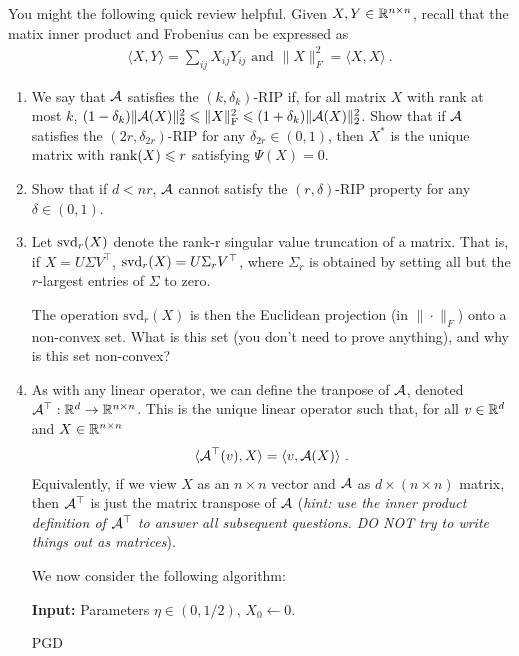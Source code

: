 \documentclass[12pt]{article}
\begin{document}
	You might the following quick review helpful. Given $X,Y \in \mathbb{R}^{n \times n}$, recall that the matix inner product and Frobenius can be expressed as
	\begin{eqnarray}
	\langle X, Y \rangle = \sum_{ij} X_{ij}Y_{ij} \text{ and } \|X\|_F^2 = \langle X,X\rangle~.
	\end{eqnarray}
	


	\begin{enumerate}
		\item We say that ${\cal A}$ satisfies the $(k,\delta_k)$-RIP if, for all matrix $X$ with rank at most $k$, $(1-\delta_k) \|{\cal A}(X)\|_2^2 \leqslant \|X\|_{\mathrm{F}}^2 \leqslant (1+\delta_k)\|{\cal A}(X)\|_2^2$. 
		Show that if ${\cal A}$ satisfies the $(2r,\delta_{2r})$-RIP  for any $\delta_{2r} \in (0,1)$, then $X^*$ is the unique matrix with $\mathrm{rank}(X) \leqslant r$ satisfying $\Psi(X) = 0$.


		\item Show that if $d < nr$, ${\cal A}$ cannot satisfy the $(r,\delta)$-RIP property for any $\delta \in (0,1)$. 
		\item Let ${\mathrm{svd}}_r(X)$ denote the rank-r singular value truncation of a matrix. That is, if $X = U\Sigma V^{\top}$, ${\mathrm{svd}}_r(X) = U\Sigma_r V^{\top}$, where $\Sigma_r$ is obtained by setting all but the $r$-largest entries of $\Sigma$ to zero.

		The operation $\mathrm{svd}_r(X)$ is then the Euclidean projection (in $\|\cdot\|_F$) onto a non-convex set. What is this set (you don't need to prove anything), and why is this set non-convex? 

		\item As with any linear operator, we can define the tranpose of ${\cal A}$, denoted ${\cal A}^\top : \mathbb{R}^d \to \mathbb{R}^{n \times n}$. This is the unique linear operator such that, for all $v \in \mathbb{R}^d$ and $X \in \mathbb{R}^{n \times n}$
		\begin{eqnarray}
		\langle {\cal A}^\top(v), X \rangle = \langle v, {\cal A}(X) \rangle~.
		\end{eqnarray}
		Equivalently, if we view $X$ as an $n \times n$ vector and ${\cal A}$ as $d \times (n \times n)$ matrix, then ${\cal A}^{\top}$ is just the matrix transpose of ${\cal A}$ (\emph{hint: use the inner product definition of ${\cal A}^\top$ to answer all subsequent questions. DO NOT try to write things out as matrices}).

		We now consider the following algorithm:
		\begin{algorithm}
		\SetAlgoLined
		\textbf{Input:} Parameters $\eta \in (0,1/2)$, $X_0 \leftarrow 0$.
		\caption{PGD}\label{algPGD}
		\end{algorithm}



\end{enumerate}
\end{document}
